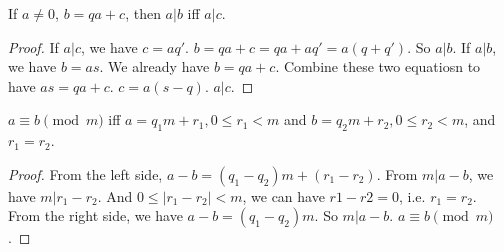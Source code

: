 \documentclass{book}
\begin{document}
If $a \ne 0$, $b = qa + c$, then $a|b$ iff $a|c$.

\begin{proof}
  If $a|c$, we have $c = aq'$. $b = qa + c = qa + aq' = a(q + q')$. So $a|b$. If
  $a|b$, we have $b = as$. We already have $b = qa +c$. Combine these two
  equatiosn to have $as = qa +c$. $c = a(s -q)$. $a|c$.
\end{proof}

$a \equiv b \pmod{m}$ iff $a = q_1 m + r_1, 0 \le r_1 < m$ and $b = q_2 m + r_2,
0 \le r_2 < m$, and $r_1 = r_2$.

\begin{proof}
  From the left side, $a - b = (q_1 - q_2) m + (r_1 - r_2)$. From $m|a-b$, we
  have $m|r_1 - r_2$. And $ 0 \le |r_1 - r_2| < m$, we can have $r1 - r2 = 0$,
  i.e. $r_1 = r_2$.\\
  From the right side, we have $a - b = (q_1 - q_2) m$. So $m|a-b$. $a \equiv b
  \pmod{m}$.
\end{proof}
\end{document}
